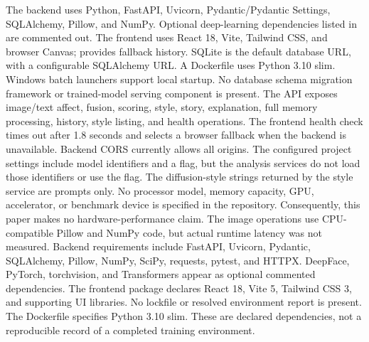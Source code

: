 \documentclass[conference]{IEEEtran}
\begin{document}
{}The backend uses Python, FastAPI, Uvicorn, Pydantic/Pydantic Settings, SQLAlchemy, Pillow, and NumPy. Optional deep-learning dependencies listed in  are commented out. The frontend uses React 18, Vite, Tailwind CSS, and browser Canvas;  provides fallback history. SQLite is the default database URL, with a configurable SQLAlchemy URL. A Dockerfile uses Python 3.10 slim. Windows batch launchers support local startup. No database schema migration framework or trained-model serving component is present.\markdownRendererInterblockSeparator
{}
\markdownRendererSectionEnd \markdownRendererSectionBegin
{}\markdownRendererInterblockSeparator
{}The API exposes image/text affect, fusion, scoring, style, story, explanation, full memory processing, history, style listing, and health operations. The frontend health check times out after 1.8 seconds and selects a browser fallback when the backend is unavailable. Backend CORS currently allows all origins. The configured project settings include model identifiers and a  flag, but the analysis services do not load those identifiers or use the flag. The diffusion-style strings returned by the style service are prompts only.\markdownRendererInterblockSeparator
{}
\markdownRendererSectionEnd 
\markdownRendererSectionEnd \markdownRendererSectionBegin
{}\markdownRendererInterblockSeparator
{}\markdownRendererSectionBegin
{}\markdownRendererInterblockSeparator
{}No processor model, memory capacity, GPU, accelerator, or benchmark device is specified in the repository. Consequently, this paper makes no hardware-performance claim. The image operations use CPU-compatible Pillow and NumPy code, but actual runtime latency was not measured.\markdownRendererInterblockSeparator
{}
\markdownRendererSectionEnd \markdownRendererSectionBegin
{}\markdownRendererInterblockSeparator
{}Backend requirements include FastAPI, Uvicorn, Pydantic, SQLAlchemy, Pillow, NumPy, SciPy, requests, pytest, and HTTPX. DeepFace, PyTorch, torchvision, and Transformers appear as optional commented dependencies. The frontend package declares React 18, Vite 5, Tailwind CSS 3, and supporting UI libraries. No lockfile or resolved environment report is present. The Dockerfile specifies Python 3.10 slim. These are declared dependencies, not a reproducible record of a completed training environment.\markdownRendererInterblockSeparator
\end{document}
